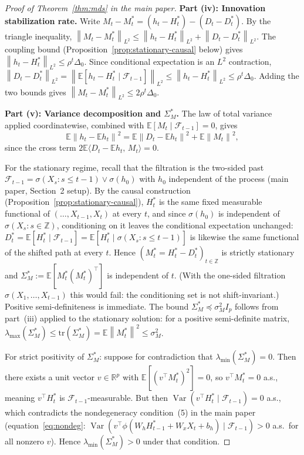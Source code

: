 \documentclass[bj,authoryear]{imsart}
\theoremstyle{plain}
\theoremstyle{definition}
\newcommand{\E}{\mathbb{E}}
\newcommand{\R}{\mathbb{R}}
\newcommand{\F}{\mathcal{F}}
\newcommand{\Z}{\mathbb{Z}}
\newcommand{\norm}[1]{\left\lVert #1 \right\rVert}
\newcommand{\given}{\mid}
\DeclareMathOperator{\Var}{Var}
\begin{document}
\begin{proof}[Proof of Theorem~\ref{thm:mds} in the main paper]
  \textbf{Part (iv): Innovation stabilization rate.}
  Write $M_t - M_t^* = (h_t - H_t^*) - (D_t - D_t^*)$.
  By the triangle inequality,
  $\norm{M_t - M_t^*}_{L^2}
  \leq \norm{h_t - H_t^*}_{L^2} + \norm{D_t - D_t^*}_{L^2}$.
  The coupling bound (Proposition~\ref{prop:stationary-causal} below) gives
  $\norm{h_t - H_t^*}_{L^2} \leq \rho^t\Delta_0$.
  Since conditional expectation is an $L^2$ contraction,
  $\norm{D_t - D_t^*}_{L^2}
  = \norm{\E[h_t - H_t^*\mid\F_{t-1}]}_{L^2}
  \leq \norm{h_t - H_t^*}_{L^2}
  \leq \rho^t\Delta_0$.
  Adding the two bounds gives $\norm{M_t - M_t^*}_{L^2} \leq 2\rho^t\Delta_0$.

  \textbf{Part (v): Variance decomposition and $\Sigma_M^*$.}
  The law of total variance applied coordinatewise, combined with
  $\E[M_t\given\F_{t-1}] = 0$, gives
  \[
    \E\norm{h_t - \E h_t}^2
    = \E\norm{D_t - \E h_t}^2 + \E\norm{M_t}^2,
  \]
  since the cross term $2\E\langle D_t - \E h_t,\, M_t\rangle = 0$.

  For the stationary regime, recall that the filtration is the two-sided
  past $\F_{t-1} = \sigma(X_s : s\leq t-1)\vee\sigma(h_0)$ with $h_0$
  independent of the process (main paper, Section~2 setup).  By the causal
  construction (Proposition~\ref{prop:stationary-causal}), $H_t^*$ is the
  same fixed measurable functional of $(\ldots,X_{t-1},X_t)$ at every $t$,
  and since $\sigma(h_0)$ is independent of $\sigma(X_s: s\in\Z)$,
  conditioning on it leaves the conditional expectation unchanged:
  $D_t^* = \E[H_t^*\given\F_{t-1}]
   = \E[H_t^*\given\sigma(X_s:s\leq t-1)]$
  is likewise the same functional of the shifted path at every $t$.
  Hence $(M_t^* = H_t^* - D_t^*)_{t\in\Z}$ is strictly stationary and
  $\Sigma_M^* := \E[M_t^*(M_t^*)^\top]$ is independent of $t$.
  (With the one-sided filtration $\sigma(X_1,\ldots,X_{t-1})$ this would
  fail: the conditioning set is not shift-invariant.)
  Positive semi-definiteness is immediate.  The bound
  $\Sigma_M^* \preceq \sigma_M^2 I_p$ follows from part~(iii) applied to the
  stationary solution: for a positive semi-definite matrix,
  $\lambda_{\max}(\Sigma_M^*) \leq \mathrm{tr}(\Sigma_M^*)
   = \E\norm{M_t^*}^2 \leq \sigma_M^2$.

  For strict positivity of $\Sigma_M^*$: suppose for contradiction that
  $\lambda_{\min}(\Sigma_M^*) = 0$.  Then there exists a unit vector
  $v\in\R^p$ with $\E[(v^\top M_t^*)^2] = 0$, so $v^\top M_t^* = 0$ a.s.,
  meaning $v^\top H_t^*$ is $\F_{t-1}$-measurable.  But then
  $\Var(v^\top H_t^*\mid\F_{t-1}) = 0$ a.s., which contradicts the
  nondegeneracy condition~(5) in the main paper
  (equation~\eqref{eq:nondeg}: $\Var(v^\top\phi(W_hH_{t-1}^*+W_xX_t+b_h)\mid\F_{t-1})>0$
  a.s.\ for all nonzero $v$).
  Hence $\lambda_{\min}(\Sigma_M^*)>0$ under that condition.


\end{proof}
\end{document}
